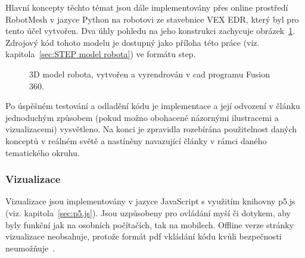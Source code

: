 \documentclass[a4paper, 12pt, twoside]{article}
\begin{document}
  Hlavní koncepty těchto témat jsou dále implementovány přes online prostředí RobotMesh v jazyce Python na robotovi ze stavebnice VEX EDR, který byl pro tento účel vytvořen. Dva úhly pohledu na jeho konstrukci zachycuje obrázek~\ref{img:3D model robota}. Zdrojový kód tohoto modelu je dostupný jako příloha této práce (viz. kapitola~\ref{sec:STEP model robota}) ve formátu \gls{step}.

  \begin{figure}[H]%
    \centering

    \hfill

    \caption[3D model robota]{3D model robota, vytvořen a vyrendrován v \gls{cad} programu Fusion 360.}%
    \label{img:3D model robota}%
  \end{figure}

  Po úspěšném testování a odladění kódu je implementace a její odvození v článku jednoduchým způsobem (pokud možno obohacené názornými ilustracemi a vizualizacemi) vysvětleno. Na konci je zpravidla rozebírána použitelnost daných konceptů v reálném světě a nastíněny navazující články v rámci daného tematického okruhu.


  \subsubsection{Vizualizace} \label{sec:Vizualizace}
  Vizualizace jsou implementovány v jazyce JavaScript s využitím knihovny p5.js (viz. kapitola~\ref{sec:p5.js}). Jsou uzpůsobeny pro ovládání myší či dotykem, aby byly funkční jak na osobních počítačích, tak na mobilech. Offline verze stránky vizualizace neobsahuje, protože formát \gls{pdf} vkládání kódu kvůli bezpečnosti neumožňuje~\cite{history-of-pdf}.
\end{document}
